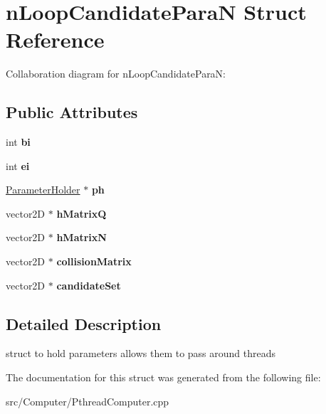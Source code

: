 \hypertarget{structnLoopCandidateParaN}{}\section{n\+Loop\+Candidate\+ParaN Struct Reference}
\label{structnLoopCandidateParaN}


Collaboration diagram for n\+Loop\+Candidate\+ParaN\+:
\subsection*{Public Attributes}
\begin{DoxyCompactItemize}
\item 
int {\bfseries bi}\hypertarget{structnLoopCandidateParaN_a73a9dac78d97623b95a250079e35d6f6}{}\label{structnLoopCandidateParaN_a73a9dac78d97623b95a250079e35d6f6}

\item 
int {\bfseries ei}\hypertarget{structnLoopCandidateParaN_ae431c2d10fcb6e6b7a87abac46952311}{}\label{structnLoopCandidateParaN_ae431c2d10fcb6e6b7a87abac46952311}

\item 
\hyperlink{structParameterHolder}{Parameter\+Holder} $\ast$ {\bfseries ph}\hypertarget{structnLoopCandidateParaN_a84bc1e76647a24cce695f4a247342130}{}\label{structnLoopCandidateParaN_a84bc1e76647a24cce695f4a247342130}

\item 
vector2D $\ast$ {\bfseries h\+MatrixQ}\hypertarget{structnLoopCandidateParaN_aadb998c0507264b6e4c96f3d01cbe889}{}\label{structnLoopCandidateParaN_aadb998c0507264b6e4c96f3d01cbe889}

\item 
vector2D $\ast$ {\bfseries h\+MatrixN}\hypertarget{structnLoopCandidateParaN_ae0a47fe3483178da9c1b319ae3391a21}{}\label{structnLoopCandidateParaN_ae0a47fe3483178da9c1b319ae3391a21}

\item 
vector2D $\ast$ {\bfseries collision\+Matrix}\hypertarget{structnLoopCandidateParaN_a11e8863c80f1a8b64ad42b71b014a204}{}\label{structnLoopCandidateParaN_a11e8863c80f1a8b64ad42b71b014a204}

\item 
vector2D $\ast$ {\bfseries candidate\+Set}\hypertarget{structnLoopCandidateParaN_a367349a2848e639813bc7a7ff97377c0}{}\label{structnLoopCandidateParaN_a367349a2848e639813bc7a7ff97377c0}

\end{DoxyCompactItemize}


\subsection{Detailed Description}
struct to hold parameters allows them to pass around threads 

The documentation for this struct was generated from the following file\+:\begin{DoxyCompactItemize}
\item 
src/\+Computer/Pthread\+Computer.\+cpp\end{DoxyCompactItemize}
